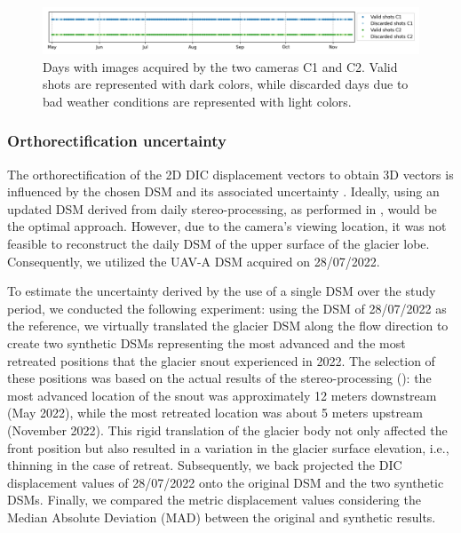 \begin{figure}[ht!]
  \centering
  \includegraphics[width=162mm]{4_discardes_shots.png}
  \caption{Days with images acquired by the two cameras C1 and C2. Valid shots are
    represented with dark colors, while discarded days due to bad weather conditions are
    represented with light colors.}
  \label{fig:4:discardes_shots}
\end{figure}

\subsubsection{Orthorectification uncertainty}
\label{sec:4:orthorectification_uncertainty}

The orthorectification of the 2D DIC displacement vectors to obtain 3D vectors is
influenced by the chosen DSM and its associated uncertainty \citep{Travelletti2012}.
Ideally, using an updated DSM derived from daily stereo-processing, as performed in
\cite{Marsy2020}, would be the optimal approach.
However, due to the camera's viewing location, it was not feasible to reconstruct the
daily DSM of the upper surface of the glacier lobe. Consequently, we utilized the UAV-A
DSM acquired on 28/07/2022.

To estimate the uncertainty derived by the use of a single DSM over the study period, we
conducted the following experiment: using the DSM of 28/07/2022 as the reference, we
virtually translated the glacier DSM along the flow direction to create two synthetic
DSMs representing the most advanced and the most retreated positions that the glacier
snout experienced in 2022.
The selection of these positions was based on the actual results of the stereo-processing
(): the most advanced location of the snout was
approximately 12 meters
downstream (May 2022), while the most retreated location was about 5 meters upstream
(November 2022). This rigid translation of the glacier body not only affected the front
position but also resulted in a variation in the glacier surface elevation, i.e.,
thinning in the case of retreat.
Subsequently, we back projected the DIC displacement values of 28/07/2022 onto the
original DSM and the two synthetic DSMs. Finally, we compared the metric displacement
values considering the Median Absolute Deviation (MAD) between the original and synthetic
results.

